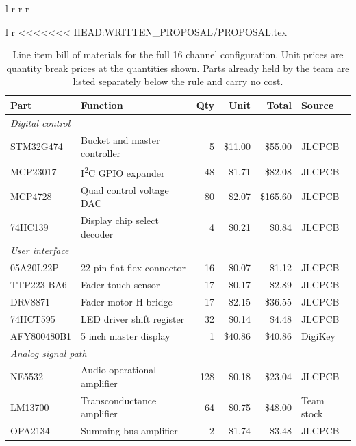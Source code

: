 \documentclass[11pt, letterpaper,titlepage]{article}
\begin{document}
\begin{table}[H]
\begin{tabular}{l r r r}
\begin{table}[H]
\begin{tabular}{l r}
<<<<<<< HEAD:WRITTEN_PROPOSAL/PROPOSAL.tex

\begin{table}[H]
\centering
\small
\caption{Line item bill of materials for the full 16 channel configuration.
Unit prices are quantity break prices at the quantities shown. Parts already
held by the team are listed separately below the rule and carry no cost.}
\label{tab:bom}
\begin{tabular}{l l r r r l}
\toprule
\textbf{Part} & \textbf{Function} & \textbf{Qty} & \textbf{Unit} & \textbf{Total} & \textbf{Source} \\
\midrule
\multicolumn{6}{l}{\textit{Digital control}} \\
STM32G474      & Bucket and master controller   & 5   & \$11.00 & \$55.00  & JLCPCB \\
MCP23017       & I\textsuperscript{2}C GPIO expander & 48 & \$1.71 & \$82.08 & JLCPCB \\
MCP4728        & Quad control voltage DAC       & 80  & \$2.07  & \$165.60 & JLCPCB \\
74HC139        & Display chip select decoder    & 4   & \$0.21  & \$0.84   & JLCPCB \\
\midrule
\multicolumn{6}{l}{\textit{User interface}} \\
05A20L22P      & 22 pin flat flex connector     & 16  & \$0.07  & \$1.12   & JLCPCB \\
TTP223-BA6     & Fader touch sensor             & 17  & \$0.17  & \$2.89   & JLCPCB \\
DRV8871        & Fader motor H bridge           & 17  & \$2.15  & \$36.55  & JLCPCB \\
74HCT595       & LED driver shift register      & 32  & \$0.14  & \$4.48   & JLCPCB \\
AFY800480B1    & 5 inch master display          & 1   & \$40.86 & \$40.86  & DigiKey \\
\midrule
\multicolumn{6}{l}{\textit{Analog signal path}} \\
NE5532         & Audio operational amplifier    & 128 & \$0.18  & \$23.04  & JLCPCB \\
LM13700        & Transconductance amplifier     & 64  & \$0.75  & \$48.00  & Team stock \\
OPA2134        & Summing bus amplifier          & 2   & \$1.74  & \$3.48   & JLCPCB \\

\end{tabular}
\end{table}
\end{tabular}
\end{table}
\end{tabular}
\end{table}
\end{document}
